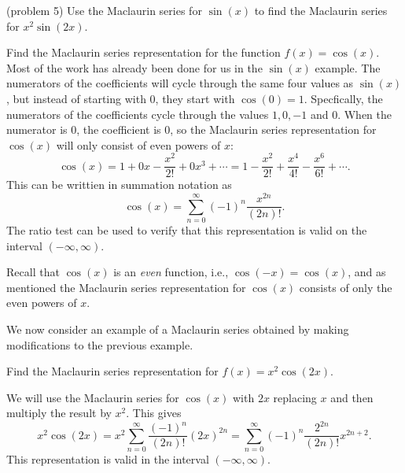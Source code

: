 \documentclass[handout]{ximera}
\begin{document}
\begin{problem}(problem 5)
Use the Maclaurin series for $\sin(x)$ to find the Maclaurin series for $x^2 \sin(2x)$.
\begin{multipleChoice}
\end{multipleChoice}
\end{problem}

\begin{example} 
Find the Maclaurin series representation for the function $f(x) = \cos(x)$.\\
Most of the work has already been done for us in the $\sin(x)$ example.  The numerators of the coefficients will cycle through the same
four values as $\sin(x)$, but instead of starting with 0, they start with $\cos(0) = 1$. 
Specfically, the numerators of the coefficients cycle through the values $1, 0, -1$ and $0$.  When the numerator is 0, the coefficient is 0,
so the Maclaurin series representation for $\cos(x)$ will only consist of even powers of $x$:
\[
\cos(x) = 1 + 0x - \frac{x^2}{2!} + 0x^3 + \cdots = 1 - \frac{x^2}{2!} + \frac{x^4}{4!} - \frac{x^6}{6!} + \cdots.
\]
This can be writtien in summation notation as
\[
\cos(x) = \sum_{n=0}^\infty (-1)^n \frac{x^{2n}}{(2n)!}.
\]
The ratio test can be used to verify that this representation is valid on the interval $(-\infty, \infty)$.
\begin{remark}
Recall that $\cos(x)$ is an \textit{even} function, 
i.e., $\cos(-x) = \cos(x)$, and as mentioned the Maclaurin series representation for $\cos(x)$ consists of only the 
even powers of $x$.
\end{remark} 
\end{example}


We now consider an example of a Maclaurin series obtained by making modifications to the previous example.

\begin{example}[example 7]
Find the Maclaurin series representation for $f(x) = x^2\cos(2x).$

We will use the Maclaurin series for $\cos(x)$ with $2x$ replacing $x$ and then multiply the result by $x^2$.
This gives
\[
x^2\cos(2x) = x^2\sum_{n=0}^\infty \frac{(-1)^n}{(2n)!}(2x)^{2n} = \sum_{n=0}^\infty (-1)^n\frac{2^{2n}}{(2n)!}x^{2n+2}.
\]
This representation is valid in the interval $(-\infty, \infty)$.
\end{example}
\end{document}

